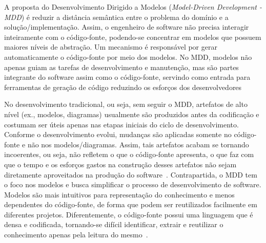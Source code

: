 

A proposta do Desenvolvimento Dirigido a Modelos (\textit{Model-Driven Development - MDD}) é reduzir a distância semântica entre o problema do domínio e a solução/implementação. Assim, o engenheiro de software não precisa interagir inteiramente com o código-fonte, podendo-se concentrar em modelos que possuem maiores níveis de abstração. Um mecanismo é responsável por gerar automaticamente o código-fonte por meio dos modelos. No MDD, modelos não apenas guiam as tarefas de desenvolvimento e manutenção, mas são partes integrante do software assim como o código-fonte, servindo como entrada para ferramentas de geração de código reduzindo os esforços dos desenvolvedores~\cite{Bittar, Kleppe:2003}


No desenvolvimento tradicional, ou seja, sem seguir o MDD, artefatos de alto nível (ex., modelos, diagramas) usualmente são produzidos antes da codificação e costumam ser úteis apenas nas etapas iniciais do ciclo de desenvolvimento. Conforme o desenvolvimento evolui, mudanças são aplicadas somente no código-fonte e não nos modelos/diagramas. Assim, tais artefatos acabam se tornando incoerentes, ou seja, não refletem o que o código-fonte apresenta, o que faz com que o tempo e os esforços gastos na construção desses artefatos não sejam diretamente aproveitados na produção do software~\cite{Bittar}. Contrapartida, o MDD tem o foco nos modelos e busca simplificar o processo de desenvolvimento de software. Modelos são mais intuitivos para representação do conhecimento e menos dependentes do código-fonte, de forma que podem ser reutilizados facilmente em diferentes projetos. Diferentemente, o código-fonte possui uma linguagem que é densa e codificada, tornando-se difícil identificar, extrair e reutilizar o conhecimento apenas pela leitura do mesmo~\citep{Kleppe:2003}.



